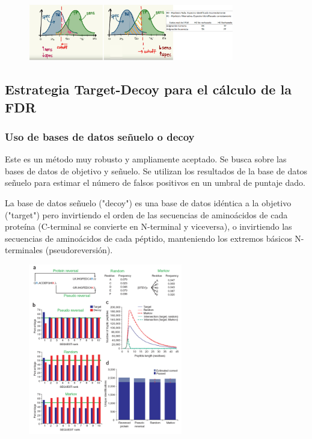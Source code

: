 \begin{figure}[h]
\centering
\includegraphics[width = 0.8\textwidth]{figs/error-types.png}
\end{figure}

\subsection{Estrategia Target-Decoy para el cálculo de la FDR}
\subsubsection{Uso de bases de datos señuelo o decoy}
Este es un método muy robusto y ampliamente aceptado. Se busca sobre las bases de datos de objetivo y señuelo. Se utilizan los resultados de la base de datos señuelo para estimar el número de falsos positivos en un umbral de puntaje dado.

La base de datos señuelo ("decoy") es una base de datos idéntica a la objetivo ("target") pero invirtiendo el orden de las secuencias de aminoácidos de cada proteína (C-terminal se convierte en N-terminal y viceversa), o invirtiendo las secuencias de aminoácidos de cada péptido, manteniendo los extremos básicos N-terminales (pseudoreversión).

\begin{figure}[h]
\centering
\includegraphics[width = 0.6\textwidth]{figs/decoydb.png}
\end{figure}

